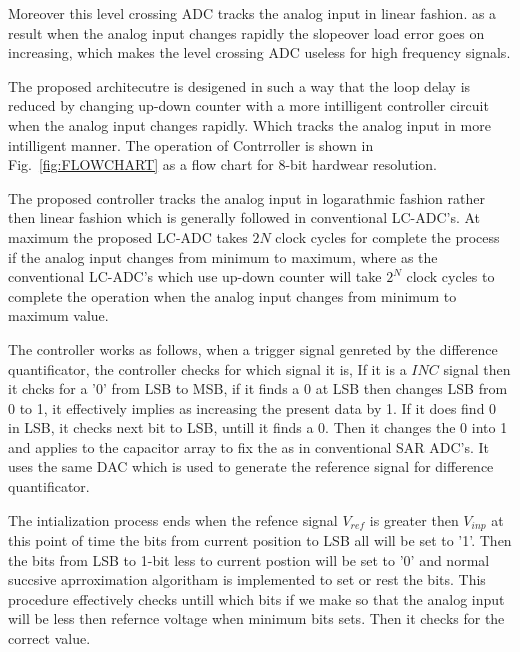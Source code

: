 Moreover this level crossing ADC tracks the analog input in linear fashion. as a result when the analog input changes rapidly the slopeover load error goes on increasing, which makes the level crossing ADC useless for high frequency signals.

	The proposed architecutre is desigened in such a way that the loop delay is reduced by changing up-down counter with a more intilligent controller circuit when the analog input changes rapidly. Which tracks the analog input in more intilligent manner. The operation of Contrroller is shown in Fig.~\ref{fig:FLOWCHART} as a flow chart for 8-bit hardwear resolution. \par

	The proposed controller tracks the analog input in logarathmic fashion rather then linear fashion which is generally followed in conventional LC-ADC's. At maximum the proposed LC-ADC takes $2N$ clock cycles for complete the process if the analog input changes from minimum to maximum, where as the conventional LC-ADC's which use up-down counter will take $2^N$ clock cycles to complete the operation when the analog input changes from minimum to maximum value.\par



	The controller works as follows, when a trigger signal genreted by the difference quantificator, the controller checks for which signal it is, If it is a $INC$ signal then it chcks for a '0' from LSB to MSB, if it finds a 0 at LSB then changes LSB from 0 to 1, it effectively implies as increasing the present data by 1. If it does find 0 in LSB, it checks next bit to LSB, untill it finds a 0. Then it changes the 0 into 1 and applies to the capacitor array to fix the as in conventional SAR ADC's. It uses the same DAC which is used to generate the reference signal for difference quantificator.\par

	The intialization process ends when the refence signal $V_{ref}$ is greater then $V_{inp}$ at this point of time the bits from current position to LSB all will be set to '1'. Then the bits from LSB to 1-bit less to current postion will be set to '0' and normal succsive aprroximation algoritham is implemented to set or rest the bits. This procedure effectively checks untill which bits if we make so that the analog input will be less then refernce voltage when minimum bits sets. Then it checks for the correct value. \par

